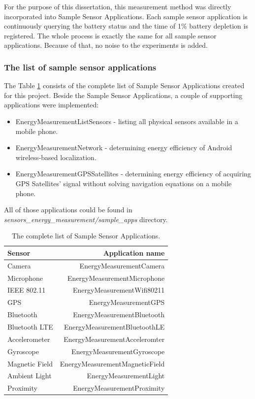 For the purpose of this dissertation, this measurement method was directly incorporated into Sample Sensor Applications. Each sample sensor application is continuously querying the battery status and the time of 1\% battery depletion is registered. The whole process is exactly the same for all sample sensor applications. Because of that, no noise to the experiments is added.

\subsubsection{The list of sample sensor applications}	
\label{s:design:measurements:applications}
\hspace{10pt} The Table \ref{table:samplesensorapps} consists of the complete list of Sample Sensor Applications created for this project. Beside the Sample Sensor Applications, a couple of supporting applications were implemented:
\begin{itemize}
	\item EnergyMeasurementListSensors - listing all physical sensors available in a mobile phone.
	\item EnergyMeasurementNetwork - determining energy efficiency of Android wireless-based localization.
	\item EnergyMeasurementGPSSatellites - determining energy efficiency of acquiring GPS Satellites' signal without solving navigation equations on a mobile phone.	
\end{itemize}
All of those applications could be found in \textit{sensors\_energy\_measurement/sample\_apps} directory.
		
\begin{table}[H]
	\centering
    \begin{tabular}{| l | r | }
    \hline
    Sensor & Application name \\ \hline
    Camera & EnergyMeasurementCamera \\ \hline
    Microphone & EnergyMeasurementMicrophone \\\hline
    IEEE 802.11 & EnergyMeasurementWifi80211 \\ \hline
    GPS & EnergyMeasurementGPS \\ \hline
    Bluetooth & EnergyMeasurementBluetooth \\ \hline
    Bluetooth LTE & EnergyMeasurementBluetoothLE \\ \hline
    Accelerometer & EnergyMeasurementAcceleromter \\ \hline
    Gyroscope & EnergyMeasurementGyroscope \\ \hline
    Magnetic Field & EnergyMeasurementMagneticField\\ \hline
    Ambient Light & EnergyMeasurementLight \\ \hline
    Proximity & EnergyMeasurementProximity \\ \hline
    \end{tabular}
    \caption{The complete list of Sample Sensor Applications.}
	\label{table:samplesensorapps}
\end{table}			


